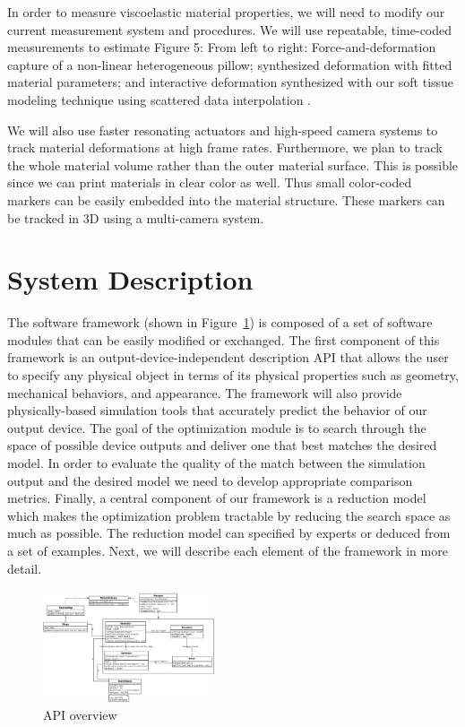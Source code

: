 \documentclass[annual]{acmsiggraph}
\begin{document}
In order to measure viscoelastic material properties, we will need to modify our current measurement
system and procedures. We will use repeatable, time-coded measurements to estimate
Figure 5: From left to right: Force-and-deformation capture of a non-linear heterogeneous pillow;
synthesized deformation with fitted material parameters; and interactive deformation synthesized
with our soft tissue modeling technique using scattered data interpolation \cite{Bickel:2010}.

We will also use faster resonating actuators and high-speed
camera systems to track material deformations at high frame rates. Furthermore, we plan to track
the whole material volume rather than the outer material surface. This is possible since we can
print materials in clear color as well. Thus small color-coded markers can be easily embedded into
the material structure. These markers can be tracked in 3D using a multi-camera system.
\section{System Description}
The software framework (shown in Figure~\ref{fig:framework}) is composed of 
a set of software
modules that can be easily modified or exchanged. The first component
of this framework is an output-device-independent description API
that allows the user to specify any physical object in terms of its physical
properties such as geometry, mechanical behaviors, and appearance. 
The framework will also provide physically-based
simulation tools that accurately predict the behavior of our output device.
The goal of the optimization module is to search through
the space of possible device outputs and deliver one that best matches the
desired model. In order to evaluate the quality of the match between the
simulation output and the desired model we need to develop appropriate
comparison metrics. Finally, a central component of our framework is
a reduction model which makes the optimization problem tractable by
reducing the search space as much as possible.
The reduction model can specified by experts or deduced from a
set of examples. Next, we will describe each element of the framework in
more detail.
\begin{figure}
\includegraphics[width=0.45\textwidth]{figure/framework.pdf}
\caption{API overview}
\label{fig:framework}
\end{figure}
\end{document}
